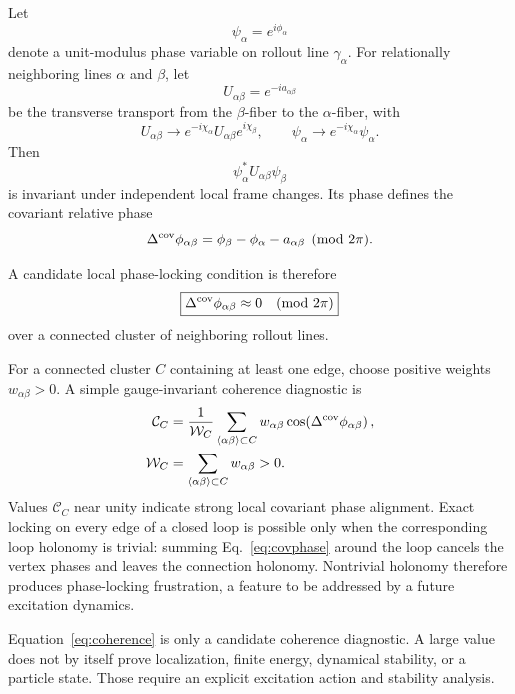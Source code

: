 \documentclass[11pt]{article}
\begin{document}
Let
\[
\psi_\alpha=e^{i\phi_\alpha}
\]
denote a unit-modulus phase variable on rollout line \(\gamma_\alpha\). For relationally neighboring lines \(\alpha\) and \(\beta\), let
\[
U_{\alpha\beta}=e^{-ia_{\alpha\beta}}
\]
be the transverse transport from the \(\beta\)-fiber to the \(\alpha\)-fiber, with
\[
U_{\alpha\beta}
\rightarrow
e^{-i\chi_\alpha}
U_{\alpha\beta}
e^{i\chi_\beta},
\qquad
\psi_\alpha\rightarrow e^{-i\chi_\alpha}\psi_\alpha.
\]
Then
\begin{equation}
\psi_\alpha^*
U_{\alpha\beta}
\psi_\beta
\end{equation}
is invariant under independent local frame changes. Its phase defines the covariant relative phase
\begin{equation}
\Delta^{\rm cov}\phi_{\alpha\beta}
=
\phi_\beta-\phi_\alpha-a_{\alpha\beta}
\pmod{2\pi}.
\label{eq:covphase}
\end{equation}

A candidate local phase-locking condition is therefore
\begin{equation}
\boxed{
\Delta^{\rm cov}\phi_{\alpha\beta}
\approx
0
\quad (\mathrm{mod}\ 2\pi)
}
\label{eq:phaselock}
\end{equation}
over a connected cluster of neighboring rollout lines.

For a connected cluster \(C\) containing at least one edge, choose positive weights \(w_{\alpha\beta}>0\). A simple gauge-invariant coherence diagnostic is
\begin{equation}
\begin{aligned}
\mathcal C_C
&=
\frac{1}{\mathcal W_C}
\sum_{\langle\alpha\beta\rangle\subset C}
w_{\alpha\beta}
\cos\!\left(
\Delta^{\rm cov}\phi_{\alpha\beta}
\right),\\
\mathcal W_C
&=
\sum_{\langle\alpha\beta\rangle\subset C}w_{\alpha\beta}>0.
\end{aligned}
\label{eq:coherence}
\end{equation}
Values \(\mathcal C_C\) near unity indicate strong local covariant phase alignment. Exact locking on every edge of a closed loop is possible only when the corresponding loop holonomy is trivial: summing Eq.~\eqref{eq:covphase} around the loop cancels the vertex phases and leaves the connection holonomy. Nontrivial holonomy therefore produces phase-locking frustration, a feature to be addressed by a future excitation dynamics.

Equation~\eqref{eq:coherence} is only a candidate coherence diagnostic. A large value does not by itself prove localization, finite energy, dynamical stability, or a particle state. Those require an explicit excitation action and stability analysis.
\end{document}
